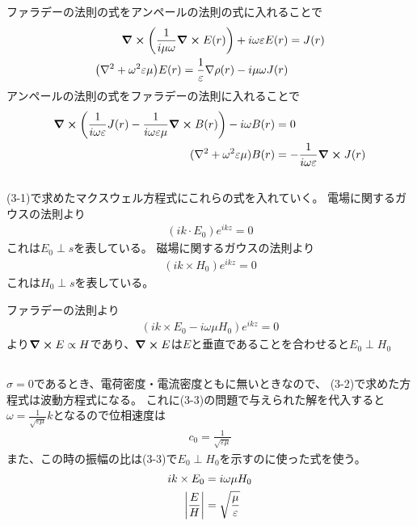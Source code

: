 \documentclass[../../master.tex]{subfiles}
\begin{document}
\subsection{}
ファラデーの法則の式をアンペールの法則の式に入れることで
\begin{align}
    \curl (\frac{1}{i\mu\omega}\curl E(r)) + i\omega\varepsilon E(r) &= J(r)\\
    \qty(\nabla^2+\omega^2 \varepsilon\mu)E(r) = \frac{1}{\varepsilon}\nabla\rho(r) - i\mu\omega J(r)
\end{align}
アンペールの法則の式をファラデーの法則に入れることで
\begin{align}
    \curl(\frac{1}{i\omega\varepsilon}J(r)-\frac{1}{i\omega\varepsilon\mu}\curl B(r)) - i\omega B(r) &= 0\\
    (\nabla^2+\omega^2\varepsilon\mu)B(r)&= - \frac{1}{i\omega \varepsilon}\curl J(r)
\end{align}

\subsection{}
(3-1)で求めたマクスウェル方程式にこれらの式を入れていく。
電場に関するガウスの法則より
\begin{align}
    (ik\cdot E_0)e^{ikz} = 0
\end{align}
これは\(E_0\perp s\)を表している。
磁場に関するガウスの法則より
\begin{align}
    (ik\times H_0)e^{ikz} =0
\end{align}
これは\(H_0\perp s\)を表している。

ファラデーの法則より
\begin{align}
    (ik\times E_0 - i\omega \mu H_0)e^{ikz}=0
\end{align}
より\(\curl E \propto H\)であり、\(\curl E\)は\(E\)と垂直であることを合わせると\(E_0 \perp H_0\)

\subsection{}
\(\sigma=0\)であるとき、電荷密度・電流密度ともに無いときなので、
(3-2)で求めた方程式は波動方程式になる。
これに(3-3)の問題で与えられた解を代入すると\(\omega = \frac{1}{\sqrt{\varepsilon\mu}}k\)となるので位相速度は
\begin{align}
    c_0 = \frac{1}{\sqrt{\varepsilon \mu}}
\end{align}
また、この時の振幅の比は(3-3)で\(E_0\perp H_0\)を示すのに使った式を使う。
\begin{align}
    ik\times E_0 &= i\omega \mu H_0\\
    \abs{\frac{E}{H}} &= \sqrt{\frac{\mu}{\varepsilon}}
\end{align}
\end{document}
